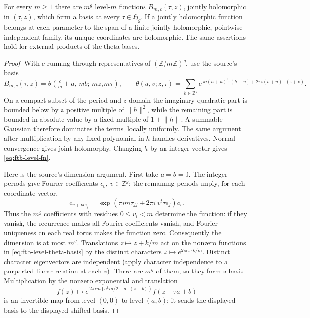 \begin{srlemma}
\label{lem:ftb-holo-level-coordinates}
For every \(m\geq1\) there are \(m^g\) level-\(m\) functions
\(B_{m,c}(\tau,z)\), jointly holomorphic in \((\tau,z)\), which form
a basis at every \(\tau\in\mathfrak H_g\).
If a jointly holomorphic function belongs at each parameter to the
span of a finite jointly holomorphic, pointwise independent family,
its unique coordinates are holomorphic.
The same assertions hold for external products of the theta bases.
\end{srlemma}
\begin{proof}
With \(c\) running through representatives of
\((\mathbb Z/m\mathbb Z)^g\), use the source's basis
\[
 B_{m,c}(\tau,z)=
 \theta\!\left(\tfrac cm+a,\,mb;\,mz,m\tau\right),\qquad
 \theta(u,v;z,\tau)=
 \sum_{h\in\mathbb Z^g}
 e^{\,\pi i(h+u)^t\tau(h+u)+2\pi i(h+u)\cdot(z+v)} .
 \tag{H4}\label{eq:ftb-level-theta-basis}
\]
On a compact subset of the period and \(z\) domain the imaginary
quadratic part is bounded below by a positive multiple of
\(\lVert h\rVert^2\), while the remaining part is bounded in
absolute value by a fixed multiple of \(1+\lVert h\rVert\).
A summable Gaussian therefore dominates the terms, locally
uniformly.  The same argument after multiplication by any fixed
polynomial in \(h\) handles derivatives.  Normal convergence gives
joint holomorphy.  Changing \(h\) by an integer vector gives
\eqref{eq:ftb-level-fn}.

Here is the source's dimension argument.  First take \(a=b=0\).
The integer periods give Fourier coefficients \(c_v\), \(v\in\mathbb
Z^g\); the remaining periods imply, for each coordinate vector,
\[
 c_{v+me_j}
       =\exp(\pi i m\tau_{jj}+2\pi i\,v^t\tau e_j)c_v .
\]
Thus the \(m^g\) coefficients with residues \(0\leq v_i<m\)
determine the function: if they vanish, the recurrence makes all
Fourier coefficients vanish, and Fourier uniqueness on each real
torus makes the function zero.  Consequently the dimension is at
most \(m^g\).  Translations \(z\mapsto z+k/m\) act on the nonzero
functions in \eqref{eq:ftb-level-theta-basis} by the distinct
characters \(k\mapsto e^{2\pi i c\cdot k/m}\).
Distinct character eigenvectors are independent (apply character
independence to a purported linear relation at each \(z\)).
There are \(m^g\) of them, so they form a basis.  Multiplication by
the nonzero exponential and translation
\[
 f(z)\longmapsto
 e^{\,2\pi i m(a^t\tau a/2+a\cdot(z+b))}
                         f(z+\tau a+b)
\]
is an invertible map from level \((0,0)\) to level \((a,b)\);
it sends the displayed basis to the displayed shifted basis.


\end{proof}
